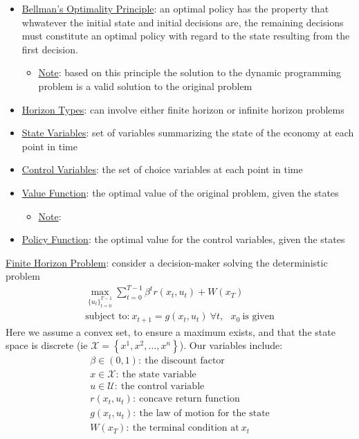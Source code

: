 \documentclass{article}
\begin{document}
\begin{itemize}
    \item \underline{Bellman's Optimality Principle}: an optimal policy has the property that whwatever the initial state and initial decisions are, the remaining decisions must constitute an optimal policy with regard to the state resulting from the first decision.
    \begin{itemize}
        \item \underline{Note}: based on this principle the solution to the dynamic programming problem is a valid solution to the original problem
    \end{itemize}
    \item  \underline{Horizon Types}: can involve either finite horizon or infinite horizon problems
    \item  \underline{State Variables}: set of variables summarizing the state of the economy at each point in time
    \item  \underline{Control Variables}: the set of choice variables at each point in time
    \item  \underline{Value Function}: the optimal value of the original problem, given the states
    \begin{itemize}
        \item \underline{Note}:
    \end{itemize}
    \item  \underline{Policy Function}: the optimal value for the control variables, given the states
\end{itemize}
\vspace{2.5mm}
\par \underline{Finite Horizon Problem}: consider a decision-maker solving the deterministic problem
\begin{gather*}
    \max_{\{ u_{t} \} _{t=0}^{T−1}} \sum_{t=0}^{T-1} \beta^{t}r(x_{t},u_{t}) + W(x_{T}) \\ \text{subject to:} \ x_{t+1} = g(x_{t}, u_{t}) \ \forall t, \ \ \ x_{0} \ \text{is given}
\end{gather*}
Here we assume a convex set, to ensure a maximum exists, and that the state space is discrete (ie $\mathcal{X} = \left\{x^{1}, x^{2}, \dots, x^{n}\right\}$). Our variables include:
\begin{gather*}
\beta \in (0,1): \ \text{the discount factor} \\
x \in \mathcal{X}:\ \text{the state variable} \\
u \in \mathcal{U}:\ \text{the control variable} \\
r(x_{t},u_{t}): \ \text{concave return function} \\
g(x_{t}, u_{t}): \ \text{the law of motion for the state} \\
W(x_{T}): \ \text{the terminal condition at} \ x_{t}
\end{gather*}
\end{document}
